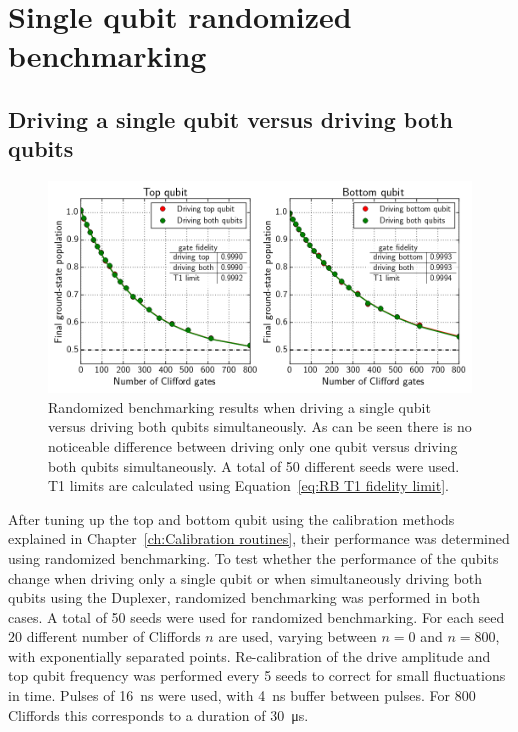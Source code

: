     \section{Single qubit randomized benchmarking}
      \label{sec:Single qubit randomized benchmarking}
      \subsection{Driving a single qubit versus driving both qubits}
        \label{ssec:Driving a single qubit versus driving both qubits}

        \begin{figure}[tb]
          \centering
          \includegraphics[width=\textwidth]{../Figures/Randomized benchmarking/RB_normal_driving_single_both.png}
          \caption{Randomized benchmarking results when driving a single qubit versus driving both qubits simultaneously. As can be seen there is no noticeable difference between driving only one qubit versus driving both qubits simultaneously. A total of 50 different seeds were used. T1 limits are calculated using Equation~\ref{eq:RB T1 fidelity limit}.}
          \label{fig:RB normal single vs both}
        \end{figure}

        After tuning up the top and bottom qubit using the calibration methods explained in Chapter~\ref{ch:Calibration routines}, their performance was determined using randomized benchmarking. To test whether the performance of the qubits change when driving only a single qubit or when simultaneously driving both qubits using the Duplexer, randomized benchmarking was performed in both cases. A total of 50 seeds were used for randomized benchmarking. For each seed $20$ different number of Cliffords $n$ are used, varying between $n=0$ and $n=800$, with exponentially separated points. Re-calibration of the drive amplitude and top qubit frequency was performed every 5 seeds to correct for small fluctuations in time. Pulses of \SI{16}{\nano \second} were used, with \SI{4}{\nano \second} buffer between pulses. For $800$ Cliffords this corresponds to a duration of \SI{30}{\micro \second}.

